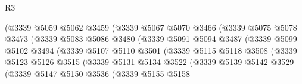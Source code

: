 \begin{lexlean}{R3}
\begin{coremodule}
                                (@3339
                                  @5059
                                  @5062
                                  @3459
                                  (@3339
                                    @5067
                                    @5070
                                    @3466
                                    (@3339
                                      @5075
                                      @5078
                                      @3473
                                      (@3339
                                        @5083
                                        @5086
                                        @3480
                                        (@3339
                                          @5091
                                          @5094
                                          @3487
                                          (@3339
                                            @5099
                                            @5102
                                            @3494
                                            (@3339
                                              @5107
                                              @5110
                                              @3501
                                              (@3339
                                                @5115
                                                @5118
                                                @3508
                                                (@3339
                                                  @5123
                                                  @5126
                                                  @3515
                                                  (@3339
                                                    @5131
                                                    @5134
                                                    @3522
                                                    (@3339
                                                      @5139
                                                      @5142
                                                      @3529
                                                      (@3339
                                                        @5147
                                                        @5150
                                                        @3536
                                                        (@3339
                                                          @5155
                                                          @5158

\end{coremodule}
\end{lexlean}
